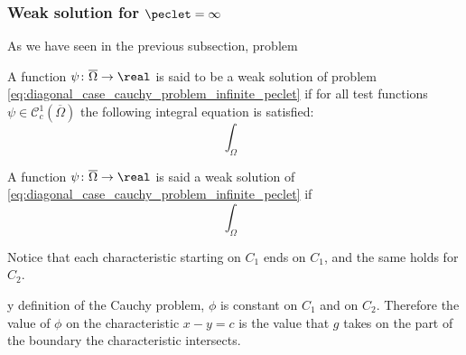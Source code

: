 \subsubsection{Weak solution for \texorpdfstring{$\peclet =
\infty$}{infinite Péclet's number}}


As we have seen in the previous subsection, problem 

\begin{definition*}
	A function $\psi \colon \overline{\Omega} \rightarrow \real$ is said to be a
	weak solution of problem
	\eqref{eq:diagonal_case_cauchy_problem_infinite_peclet} if for all test
	functions $\psi \in \mathcal{C}^1_c (\overline{\Omega})$ the following
	integral equation is satisfied:
	\begin{equation*}
		\int_\Omega 
	\end{equation*}
	
	A function $\psi \colon \overline{\Omega} \rightarrow \real$
	is said a weak solution of
	\eqref{eq:diagonal_case_cauchy_problem_infinite_peclet} if 
	\[
		\int_\Omega 
	\]
\end{definition*}


Notice that each characteristic starting on $C_1$ ends on $C_1$, and the same
holds for $C_2$. 

y definition of the Cauchy problem, $\phi$ is
constant on $C_1$ and on $C_2$. Therefore the value of $\phi$ on the
characteristic $x - y = c$ is the value that $g$ takes on the part of the
boundary the characteristic intersects.
